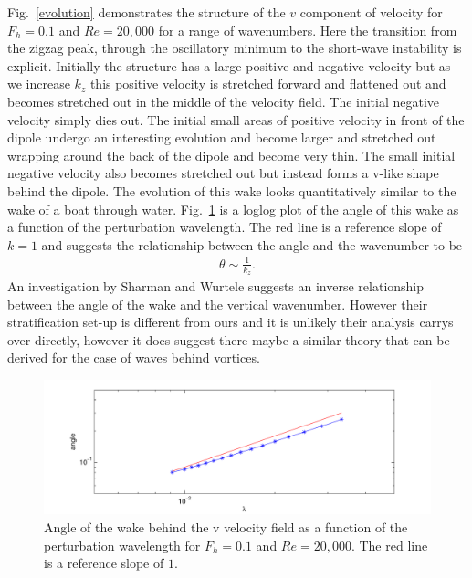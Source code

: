Fig.~\ref{evolution} demonstrates the structure of the $v$ component of velocity for $F_{h}=0.1$ and $Re=20{,}000$ for a range of wavenumbers. Here the transition from the zigzag peak, through the oscillatory minimum to the short-wave instability is explicit. Initially the structure has a large positive and negative velocity but as we increase $k_{z}$ this positive velocity is stretched forward and flattened out and becomes stretched out in the middle of the velocity field. The initial negative velocity simply dies out. The initial small areas of positive velocity in front of the dipole undergo an interesting evolution and become larger and stretched out wrapping around the back of the dipole and become very thin. The small initial negative velocity also becomes stretched out but instead forms a v-like shape behind the dipole. The evolution of this wake looks quantitatively similar to the wake of a boat through water. Fig.~\ref{wake} is a loglog plot of the angle of this wake as a function of the perturbation wavelength. The red line is a reference slope of $k=1$ and suggests the relationship between the angle and the wavenumber to be
\begin{align}
\theta \sim \frac{1}{k_{z}}.
\end{align} 
An investigation by Sharman and Wurtele \cite{sharman1983ship} suggests an inverse relationship between the angle of the wake and the vertical wavenumber. However their stratification set-up is different from ours and it is unlikely their analysis carrys over directly, however it does suggest there maybe a similar theory that can be derived for the case of waves behind vortices. 

\begin{figure}
\begin{center}
\includegraphics[width=\textwidth]{wake_fh_01_re_20000}
\caption{Angle of the wake behind the v velocity field as a function of the perturbation wavelength for $F_{h}=0.1$ and $Re=20{,}000$. The red line is a reference slope of $1$.}
\label{wake}
\end{center}
\end{figure}

